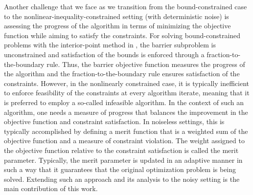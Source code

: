 Another challenge that we face as we transition from the bound-constrained case to the nonlinear-inequality-constrained setting (with deterministic noise) is assessing the progress of the algorithm in terms of  minimizing the objective function while aiming to satisfy the constraints.  For solving bound-constrained problems with the interior-point method in \cite{dezfulian2024convergence}, the barrier subproblem is unconstrained and satisfaction of the bounds is enforced through a fraction-to-the-boundary rule.  Thus, the barrier objective function measures the progress of the algorithm and the fraction-to-the-boundary rule ensures satisfaction of the constraints.  However, in the nonlinearly constrained case, it is typically inefficient to enforce feasibility of the constraints at every algorithm iterate, meaning that it is preferred to employ a so-called infeasible algorithm.  In the context of such an algorithm, one needs a measure of progress that balances the improvement in the objective function and constraint satisfaction.  In noiseless settings, this is typically accomplished by defining a merit function that is a weighted sum of the objective function and a measure of constraint violation.  The weight assigned to the objective function relative to the constraint satisfaction \cite{nocedal1999numerical} is called the merit parameter.  Typically, the merit parameter is updated in an adaptive manner in such a way that it guarantees that the original optimization problem is being solved.  Extending such an approach and its analysis to the noisy setting is the main contribution of this work.


